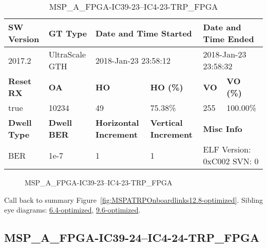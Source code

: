 \begin{table}[h]
\centering
\caption{MSP\_A\_FPGA-IC39-23--IC4-23-TRP\_FPGA}
\label{tab:MSPAFPGAIC3923IC423TRPFPGA12.8-optimized}
\begin{tabular}{@{}|l|l|l|l|l|l|@{}}
\toprule
\textbf{SW Version}                & \textbf{GT Type}   & \multicolumn{2}{l|}{\textbf{Date and Time Started}}            & \multicolumn{2}{l|}{\textbf{Date and Time Ended}}        \\ \midrule
2017.2                       & UltraScale GTH          & \multicolumn{2}{l|}{2018-Jan-23 23:58:12}                   & \multicolumn{2}{l|}{2018-Jan-23 23:58:32}               \\ \midrule
\textbf{Reset RX}                  & \textbf{OA} & \textbf{HO}   & \textbf{HO (\%)} & \textbf{VO} & \textbf{VO (\%)} \\ \midrule
true & 10234        & 49          & 75.38\%        & 255        & 100.00\%       \\ \midrule
\textbf{Dwell Type}                & \textbf{Dwell BER} & \textbf{Horizontal Increment} & \textbf{Vertical Increment}    & \multicolumn{2}{l|}{\textbf{Misc Info}}                  \\ \midrule
BER                            & 1e-7        & 1        & 1           & \multicolumn{2}{l|}{ELF Version: 0xC002 SVN: 0}                         \\ \bottomrule
\end{tabular}
\end{table}

\begin{figure}[h]
\caption{MSP\_A\_FPGA-IC39-23--IC4-23-TRP\_FPGA} \label{fig:MSPAFPGAIC3923IC423TRPFPGA12.8-optimized}
\end{figure}

Call back to summary Figure~\ref{fig:MSPATRPOnboardlinks12.8-optimized}.
Sibling eye diagrams: \hyperref[sec:MSPAFPGAIC3923IC423TRPFPGA6.4-optimized]{6.4-optimized}, \hyperref[sec:MSPAFPGAIC3923IC423TRPFPGA9.6-optimized]{9.6-optimized}.

\clearpage
\newpage


\subsection{MSP\_A\_FPGA-IC39-24--IC4-24-TRP\_FPGA}\label{sec:MSPAFPGAIC3924IC424TRPFPGA12.8-optimized}

